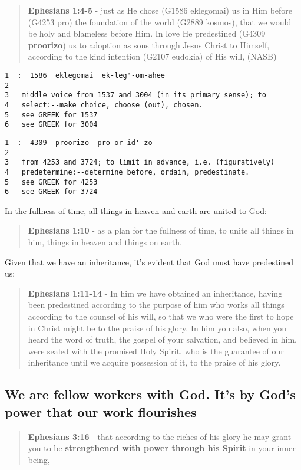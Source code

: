 \documentclass[11pt]{article}
\begin{document}
\begin{quote}
\textbf{Ephesians 1:4-5} - just as He chose (G1586 eklegomai) us in Him before (G4253 pro) the foundation of the world (G2889 kosmos), that we would be holy and blameless before Him. In love He predestined (G4309 \textbf{proorizo}) us to adoption as sons through Jesus Christ to Himself, according to the kind intention (G2107 eudokia) of His will, (NASB)
\end{quote}

\begin{verbatim}
1  :  1586  eklegomai  ek-leg'-om-ahee
2  
3   middle voice from 1537 and 3004 (in its primary sense); to
4   select:--make choice, choose (out), chosen.
5   see GREEK for 1537
6   see GREEK for 3004
\end{verbatim}

\begin{verbatim}
1  :  4309  proorizo  pro-or-id'-zo
2  
3   from 4253 and 3724; to limit in advance, i.e. (figuratively)
4   predetermine:--determine before, ordain, predestinate.
5   see GREEK for 4253
6   see GREEK for 3724
\end{verbatim}

In the fullness of time, all things in heaven and earth are united to God:

\begin{quote}
\textbf{Ephesians 1:10} - as a plan for the fullness of time, to unite all things in him, things in heaven and things on earth.
\end{quote}

Given that we have an inheritance, it's evident that God must have predestined us:

\begin{quote}
\textbf{Ephesians 1:11-14} - In him we have obtained an inheritance, having been predestined according to the purpose of him who works all things according to the counsel of his will, so that we who were the first to hope in Christ might be to the praise of his glory. In him you also, when you heard the word of truth, the gospel of your salvation, and believed in him, were sealed with the promised Holy Spirit, who is the guarantee of our inheritance until we acquire possession of it, to the praise of his glory.
\end{quote}

\subsection{We are fellow workers with God. It's by God's power that our work flourishes}
\label{sec:orgf42239b}
\begin{quote}
\textbf{Ephesians 3:16} - that according to the riches of his glory he may grant you to be \textbf{strengthened with power through his Spirit} in your inner being,
\end{quote}
\end{document}
